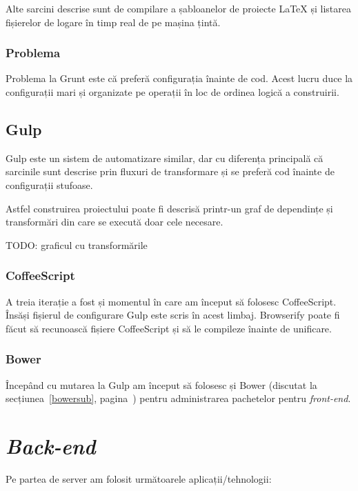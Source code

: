 \documentclass[a4wide,12pt]{report}
\newcommand{\eng}[1]{\emph{#1}} %
\newcommand{\idee}[1]{{\color{red} #1}}
\begin{document}
Alte sarcini descrise sunt de compilare a șabloanelor de proiecte \LaTeX{} și
listarea fișierelor de logare în timp real de pe mașina țintă.

\subsubsection{Problema}

Problema la Grunt este că preferă configurația înainte de cod. Acest lucru duce
la configurații mari și organizate pe operații în loc de ordinea logică a
construirii.

\subsection{Gulp}

Gulp este un sistem de automatizare similar, dar cu diferența principală că
sarcinile sunt descrise prin fluxuri de transformare și se preferă cod înainte
de configurații stufoase.

Astfel construirea proiectului poate fi descrisă printr-un graf de dependințe și
transformări din care se execută doar cele necesare.

\idee{TODO: graficul cu transformările}

\subsubsection{CoffeeScript}

A treia iterație a fost și momentul în care am început să folosesc CoffeeScript.
Însăși fișierul de configurare Gulp este scris în acest limbaj. Browserify poate
fi făcut să recunoască fișiere CoffeeScript și să le compileze înainte de
unificare.

\subsubsection{Bower}

Începând cu mutarea la Gulp am început să folosesc și Bower (discutat la
secțiunea~\ref{bowersub}, pagina~\pageref{bowersub}) pentru administrarea
pachetelor pentru \eng{front-end}.

\section{\eng{Back-end}}

Pe partea de server am folosit următoarele aplicații/tehnologii:
\end{document}
